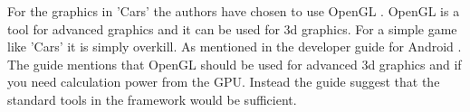 For the graphics in 'Cars' the authors have chosen to use OpenGL \cite{opengl}.
OpenGL is a tool for advanced graphics and it can be used for 3d graphics.
For a simple game like 'Cars' it is simply overkill.
As mentioned in the developer guide for Android \cite{android_opengl}.
The guide mentions that OpenGL should be used for advanced 3d graphics and if you need calculation power from the GPU.
Instead the guide suggest that the standard tools in the framework would be sufficient.